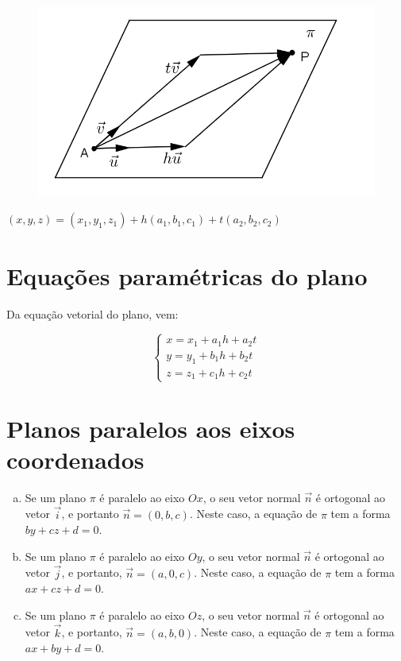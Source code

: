 \begin{multicols}{2}
\begin{figure}[H]
\centering
\includegraphics[scale=1]{analitica/imagens/plano-vet.png}
\end{figure}

$(x,y,z)=(x_1,y_1,z_1)+h(a_1,b_1,c_1)+t(a_2,b_2,c_2)$
\end{multicols}

\section{Equações paramétricas do plano}

Da equação vetorial do plano, vem:

$$\left\{ \begin{array}{l}
x=x_1+a_1h+a_2t\\
y=y_1+b_1h+b_2t\\
z=z_1+c_1h+c_2t \end{array} \right. $$

\section{Planos paralelos aos eixos coordenados}

\begin{enumerate}[(a)]
 \item Se um plano $\pi$ é paralelo ao eixo $Ox$, o seu vetor normal $\vec n$ é ortogonal ao vetor $\vec i$, e  portanto $\vec n=(0,b,c)$. Neste caso, a equação de $\pi$  tem a forma $by + cz + d = 0$.
 \item Se um plano $\pi$ é paralelo ao eixo $Oy$, o seu vetor normal $\vec n$ é ortogonal ao vetor $\vec j$, e  portanto, $\vec n=(a,0,c)$. Neste caso, a equação de $\pi$ tem a forma $ax+cz+d=0$.
 \item Se um plano $\pi$ é paralelo ao eixo $Oz$, o seu vetor normal $\vec n$ é ortogonal ao vetor $\vec k$, e portanto, $\vec n=(a,b,0)$. Neste caso, a equação de $\pi$ tem a forma $ax+by+d=0$.
\end{enumerate}

